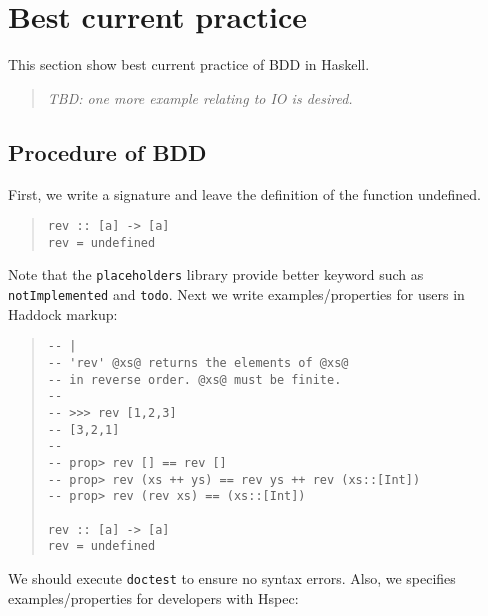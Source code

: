 \documentclass[preprint]{sigplanconf}
\newcommand{\hspec}{Hspec}
\begin{document}


\section{Best current practice}
\label{ref:Best-current-practice}

This section show best current practice of
BDD in Haskell.

\begin{quote}
    \emph{TBD: one more example relating to IO is desired.}
\end{quote}

\subsection{Procedure of BDD}

First, we write a signature and leave the definition of the function undefined.

\begin{quote}
\small
\begin{verbatim}
rev :: [a] -> [a]
rev = undefined
\end{verbatim}
\end{quote}

\noindent Note that the {\tt placeholders} library provide better keyword such as {\tt notImplemented} and {\tt todo}.
Next we write examples/properties for users in Haddock markup:

\begin{quote}
\small
\begin{verbatim}
-- |
-- 'rev' @xs@ returns the elements of @xs@
-- in reverse order. @xs@ must be finite.
--
-- >>> rev [1,2,3]
-- [3,2,1]
--
-- prop> rev [] == rev []
-- prop> rev (xs ++ ys) == rev ys ++ rev (xs::[Int])
-- prop> rev (rev xs) == (xs::[Int])

rev :: [a] -> [a]
rev = undefined
\end{verbatim}
\end{quote}

\noindent We should execute {\tt doctest} to ensure no syntax errors.
Also, we specifies examples/properties for developers with \hspec{}:
\end{document}
